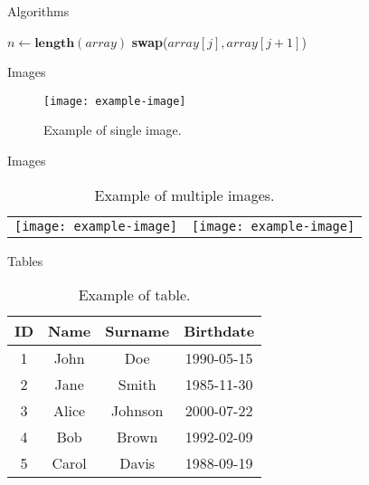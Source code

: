 \documentclass[12pt]{beamer}
\begin{document}
\begin{frame}[allowframebreaks]{Algorithms}
	\begin{algorithmic}
		\State $n \gets \textbf{length}(array)$
		\State \textbf{swap}($array[j], array[j + 1]$)
		\EndIf
		\EndFor
		\EndFor
		\EndProcedure
		\label{alg:1}
	\end{algorithmic}
\end{frame}

\begin{frame}[allowframebreaks]{Images}
	\begin{figure}
		\centering
		\texttt{[image: example-image]}
		\caption{Example of single image.}
		\label{fig:1}
	\end{figure}
\end{frame}

\begin{frame}[allowframebreaks]{Images}
	\begin{table}
		\centering
		\begin{tabular}{cc}
			\texttt{[image: example-image]} &
			\texttt{[image: example-image]}   \\
		\end{tabular}
		\caption{Example of multiple images.}
		\label{tab:1}
	\end{table}
\end{frame}

\begin{frame}[allowframebreaks]{Tables}
	\begin{table}
		\centering
		\begin{tabular}{|c|c|c|c|}
			\hline
			\textbf{ID} & \textbf{Name} & \textbf{Surname} & \textbf{Birthdate} \\
			\hline
			1           & John          & Doe              & 1990-05-15         \\
			\hline
			2           & Jane          & Smith            & 1985-11-30         \\
			\hline
			3           & Alice         & Johnson          & 2000-07-22         \\
			\hline
			4           & Bob           & Brown            & 1992-02-09         \\
			\hline
			5           & Carol         & Davis            & 1988-09-19         \\
			\hline
		\end{tabular}
		\caption{Example of table.}
		\label{tab:2}
	\end{table}
\end{frame}
\end{document}
